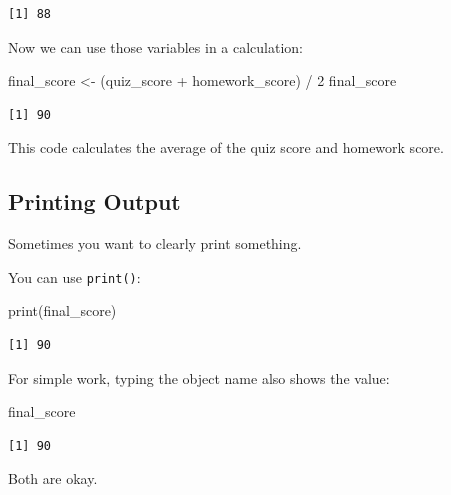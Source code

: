 \documentclass[
  letterpaper,
  DIV=11,
  numbers=noendperiod]{scrartcl}
\newenvironment{Shaded}{\begin{snugshade}}{\end{snugshade}}
\newcommand{\DecValTok}[1]{\textcolor[rgb]{0.68,0.00,0.00}{#1}}
\newcommand{\FunctionTok}[1]{\textcolor[rgb]{0.28,0.35,0.67}{#1}}
\newcommand{\NormalTok}[1]{\textcolor[rgb]{0.00,0.23,0.31}{#1}}
\newcommand{\OtherTok}[1]{\textcolor[rgb]{0.00,0.23,0.31}{#1}}
\newcommand{\SpecialCharTok}[1]{\textcolor[rgb]{0.37,0.37,0.37}{#1}}
\begin{document}
\begin{verbatim}
[1] 88
\end{verbatim}

Now we can use those variables in a calculation:

\begin{Shaded}
\begin{Highlighting}[]
\NormalTok{final\_score }\OtherTok{\textless{}{-}}\NormalTok{ (quiz\_score }\SpecialCharTok{+}\NormalTok{ homework\_score) }\SpecialCharTok{/} \DecValTok{2}
\NormalTok{final\_score}
\end{Highlighting}
\end{Shaded}

\begin{verbatim}
[1] 90
\end{verbatim}

This code calculates the average of the quiz score and homework score.

\subsection{Printing Output}\label{printing-output}

Sometimes you want to clearly print something.

You can use \texttt{print()}:

\begin{Shaded}
\begin{Highlighting}[]
\FunctionTok{print}\NormalTok{(final\_score)}
\end{Highlighting}
\end{Shaded}

\begin{verbatim}
[1] 90
\end{verbatim}

For simple work, typing the object name also shows the value:

\begin{Shaded}
\begin{Highlighting}[]
\NormalTok{final\_score}
\end{Highlighting}
\end{Shaded}

\begin{verbatim}
[1] 90
\end{verbatim}

Both are okay.
\end{document}

